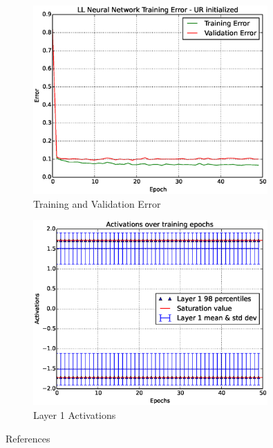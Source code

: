 \documentclass[Proceedings]{ascelike}
\begin{document}
\begin{figure}[H]
    \caption{Training and Validation Error}
    \label{fig:ll_test_err}
    \centering
    \includegraphics[width=0.8\textwidth,keepaspectratio]{ll_perf.eps}
\end{figure}

\begin{figure}[H]
    \caption{Layer 1 Activations}
    \label{fig:ll_actv_dist}
    \centering
    \includegraphics[width=0.8\textwidth,keepaspectratio]{ll_actv.eps}
\end{figure}

{References}

\end{document}
